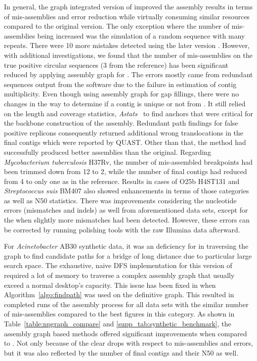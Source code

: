 In general, the graph integrated version of \npscarf{} improved the assembly results in terms of mis-assemblies and error reduction while virtually consuming similar resources compared to the original version.
The only exception where the number of mis-assemblies being increased was the simulation of a random sequence with many repeats. There were 10 more mistakes detected using the later version \npscarfg{}. However, with additional investigations, we found that the number of mis-assemblies on the true positive circular sequences (3 from the reference) has been significant reduced by applying assembly graph for \npscarf{}. The errors mostly came from redundant sequences output from the software due to the failure in estimation of contig multiplicity.
Even though using assembly graph for gap fillings, there were no changes in the way to determine if a contig is unique or not from \npscarfg{}. 
It still relied on the length and coverage statistics, \IE{} \emph{Astats}~\cite{MyersSD2000} to find anchors that were critical for the backbone construction of the assembly.
Redundant path findings for false positive replicons consequently returned additional wrong translocations in the final contigs which were reported by QUAST. 
Other than that, the method had successfully produced better assemblies than the original. Regarding \emph{Mycobacterium tuberculosis} H37Rv, the number of mis-assembled breakpoints had been trimmed down from 12 to 2, while the number of final contigs had reduced from 4 to only one as in the reference. Results in cases of \ec{} O25b H4ST131 and \emph{Streptococcus suis} BM407 also showed enhancements in terms of those categories as well as N50 statistics. 
There was improvements considering the nucleotide errors (mismatches and indels) as well from aforementioned data sets, except for the \ec{} when slightly more mismatches had been detected. However, these errors can be corrected by running polishing tools with the raw Illumina data afterward. 

For \emph{Acinetobacter} AB30 synthetic data, it was an deficiency for \npscarfg{} in traversing the graph to find candidate paths for a bridge of long distance due to particular large search space.
The exhaustive, naive DFS implementation for this version of \npscarf{} required a lot of memory to traverse a complex assembly graph that usually exceed a normal desktop's capacity.
This issue has been fixed in \npgraph{} when Algorithm~\ref{algo:findpath} was used on the definitive graph. This resulted in completed runs of the assembly process for all data sets with the similar number of mis-assemblies compared to the best figures in this category.
As shown in Table~\ref{table:npgraph_compare} and \ref{supp_tab:synthetic_benchmark}, the assembly graph based methods offered significant improvements when compared to \npscarf{}. Not only because of the clear drops with respect to mis-assemblies and errors, but it was also reflected by the number of final contigs and their N50 as well.

